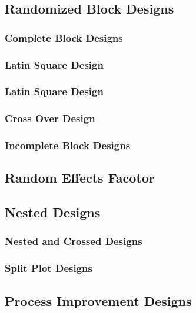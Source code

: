 \subsection{Randomized Block Designs}

\subsubsection{Complete Block Designs}


\subsubsection{Latin Square Design}

\subsubsection{Latin Square Design}

\subsubsection{Cross Over Design}

\subsubsection{Incomplete Block Designs}


\subsection{Random Effects Facotor}

\subsection{Nested Designs}


\subsubsection{Nested and Crossed Designs}

\subsubsection{Split Plot Designs}




\subsection{Process Improvement Designs}

